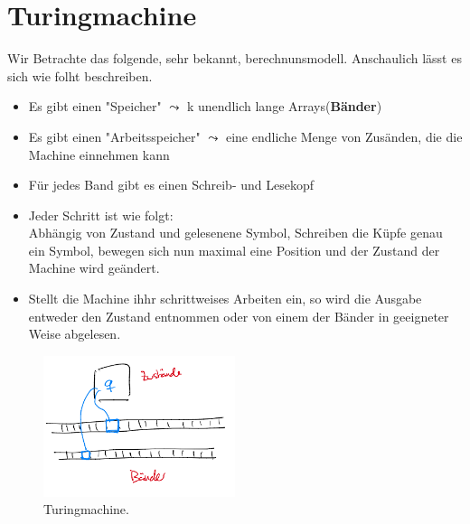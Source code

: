 \section{Turingmachine} 
\begin{sloppypar}
  Wir Betrachte das folgende, sehr bekannt, berechnunsmodell. Anschaulich lässt es sich wie folht beschreiben.
\end{sloppypar} 
\begin{itemize}
  \renewcommand\labelitemi{-}
  \item Es gibt einen "Speicher" $\leadsto $ k unendlich lange Arrays(\textbf{Bänder})
  \item Es gibt einen "Arbeitsspeicher" $\leadsto$ eine endliche Menge von Zusänden, die die Machine einnehmen kann
  \item Für jedes Band gibt es einen Schreib- und Lesekopf 
  \item Jeder Schritt ist wie folgt:\\ Abhängig von Zustand und gelesenene Symbol, Schreiben die Küpfe genau ein Symbol, bewegen sich nun maximal eine Position und der Zustand der Machine wird geändert.
  \item Stellt die Machine ihhr schrittweises Arbeiten ein, so wird die Ausgabe entweder den Zustand entnommen oder von einem der Bänder in geeigneter Weise abgelesen.
\end{itemize}

\begin{figure}[htp]
  \centering
  \includegraphics[width=0.5\textwidth]{Turingmachine/turing_sym.png}
  \caption{Turingmachine.}
  \label{fig:tm}
\end{figure}

